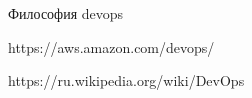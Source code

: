 

\begin{enumerate}[{label=[\arabic{*}]}]

\item Философия devops \label{book_effective_devops}

\item https://aws.amazon.com/devops/ \label{site_aws.amazon.com/devops}

\item https://ru.wikipedia.org/wiki/DevOps \label{site_ru.wikipedia.org/wiki/devops}

\end{enumerate}
